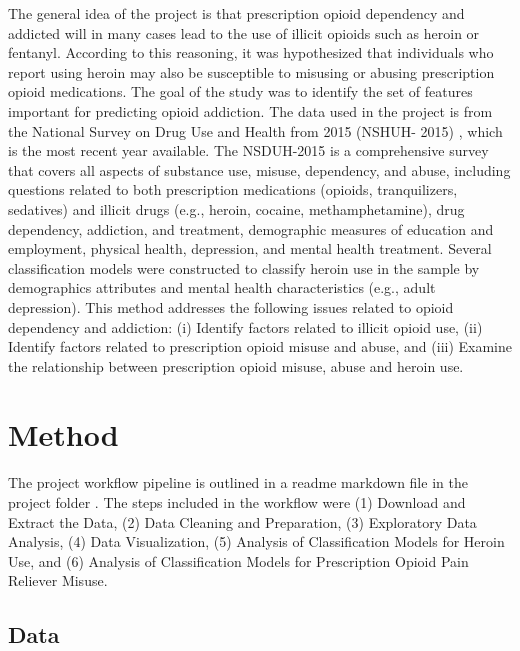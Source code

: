 \documentclass[sigconf]{acmart}
\begin{document}
The general idea of the project is that prescription opioid dependency and
addicted will in many cases lead to the use of illicit opioids such as heroin 
or fentanyl. According to this reasoning, it was hypothesized that individuals 
who report using heroin may also be susceptible to misusing or abusing 
prescription opioid medications. The goal of the study was to identify the set 
of features important for predicting opioid addiction. The data used in the 
project is from the National Survey on Drug Use and Health from 2015 (NSHUH-
2015) \cite{samhsa16}, which is the most recent year available. The NSDUH-2015 
is a comprehensive survey that covers all aspects of substance use, misuse, 
dependency, and abuse, including questions related to both prescription 
medications (opioids, tranquilizers, sedatives) and illicit drugs (e.g., 
heroin, cocaine, methamphetamine), drug dependency, addiction, and treatment, 
demographic measures of education and employment, physical health, depression, 
and mental health treatment. Several classification models were constructed to 
classify heroin use in the sample by demographics attributes and mental health 
characteristics (e.g., adult depression). This method addresses the following
issues related to opioid dependency and addiction: (i) Identify factors related 
to illicit opioid use, (ii) Identify factors related to prescription opioid 
misuse and abuse, and (iii) Examine the relationship between prescription 
opioid misuse, abuse and heroin use. 


\section{Method}

The project workflow pipeline is outlined in a readme markdown file in the
project folder \cite{pipeline17}. The steps included in the workflow were 
(1) Download and Extract the Data, (2) Data Cleaning and Preparation, 
(3) Exploratory Data Analysis, (4) Data Visualization, (5) Analysis of 
Classification Models for Heroin Use, and (6) Analysis of Classification 
Models for Prescription Opioid Pain Reliever Misuse.

\subsection{Data} 
\end{document}
